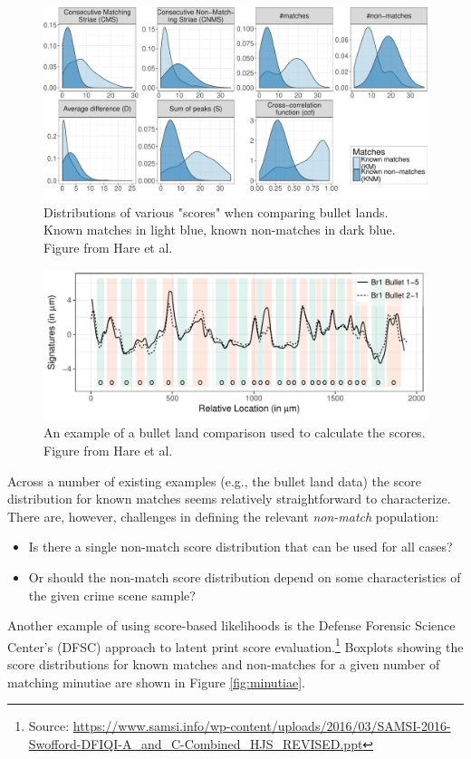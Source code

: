 \documentclass[]{book}
\providecommand{\tightlist}{%
  \setlength{\itemsep}{0pt}\setlength{\parskip}{0pt}}
\let\rmarkdownfootnote\footnote%
\def\footnote{\protect\rmarkdownfootnote}
\theoremstyle{definition}
\theoremstyle{definition}
\theoremstyle{remark}
\begin{document}
\begin{figure}

{\centering \includegraphics[width=.65\linewidth]{img/density-overview-1} 

}

\caption{Distributions of various "scores" when comparing bullet lands. Known matches in light blue, known non-matches in dark blue. Figure from Hare et al.}\label{fig:scorebullet}
\end{figure}

\begin{figure}

{\centering \includegraphics[width=.65\linewidth]{img/smoothmatch-1} 

}

\caption{An example of a bullet land comparison used to calculate the scores. Figure from Hare et al.}\label{fig:comparebullet}
\end{figure}

Across a number of existing examples (e.g., the bullet land data) the
score distribution for known matches seems relatively straightforward to
characterize. There are, however, challenges in defining the relevant
\emph{non-match} population:

\begin{itemize}
\tightlist
\item
  Is there a single non-match score distribution that can be used for
  all cases?
\item
  Or should the non-match score distribution depend on some
  characteristics of the given crime scene sample?
\end{itemize}

Another example of using score-based likelihoods is the Defense Forensic
Science Center's (DFSC) approach to latent print score
evaluation.\footnote{Source:
  \url{https://www.samsi.info/wp-content/uploads/2016/03/SAMSI-2016-Swofford-DFIQI-A_and_C-Combined_HJS_REVISED.ppt}}
Boxplots showing the score distributions for known matches and
non-matches for a given number of matching minutiae are shown in Figure
\ref{fig:minutiae}.
\end{document}
